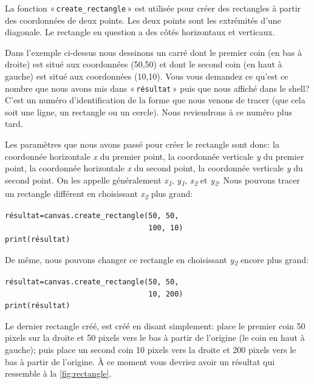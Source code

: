 La fonction « \texttt{create\_rectangle} » est utilisée pour créer des rectangles à partir des coordonnées de deux points. Les deux points sont les extrémités d'une diagonale. Le rectangle en question a des côtés horizontaux et verticaux.

Dans l'exemple ci-dessus nous dessinons un carré dont le premier coin (en bas à droite) est situé aux coordonnées (50,50) et dont le second coin (en haut à gauche) est situé aux coordonnées (10,10).
Vous vous demandez ce qu'est ce nombre que nous avons mis dans « \texttt{résultat} » puis que nous affiché dans le shell? C'est un numéro d'identification de la forme que nous venons de tracer (que cela soit une ligne, un rectangle ou un cercle). Nous reviendrons à ce numéro plus tard.

Les paramètres que nous avons passé pour créer le rectangle sont donc: la coordonnée horizontale \emph{x} du premier point, la coordonnée verticale \emph{y} du premier point, la coordonnée horizontale \emph{x} du second point, la coordonnée verticale \emph{y} du second point. On les appelle généralement \emph{x\textsubscript{1}}, \emph{y\textsubscript{1}}, \emph{x\textsubscript{2}} et \emph{y\textsubscript{2}}. Nous pouvons tracer un rectangle différent en choisissant \emph{x\textsubscript{2}} plus grand:

\begin{Verbatim}[frame=single,rulecolor=\color{mbleu}, label=à taper]
résultat=canvas.create_rectangle(50, 50, 
                                 100, 10)
print(résultat)
\end{Verbatim}

De même, nous pouvons changer ce rectangle en choisissant \emph{y\textsubscript{2}} encore plus grand:

\begin{Verbatim}[frame=single,rulecolor=\color{mbleu}, label=à taper]
résultat=canvas.create_rectangle(50, 50, 
                                 10, 200)
print(résultat)
\end{Verbatim}


Le dernier rectangle créé, est créé en disant simplement: place le premier coin 50 pixels sur la droite et 50 pixels vers le bas à partir de l'origine (le coin en haut à gauche); puis place un second coin 10 pixels vers la droite et 200 pixels vers le bas à partir de l'origine. À ce moment vous devriez avoir un résultat qui ressemble à la \autoref{fig:rectangle}.

